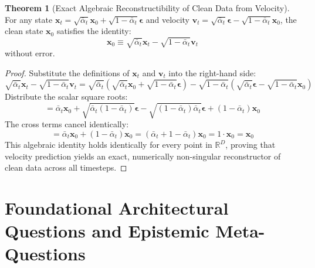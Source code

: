 \documentclass[11pt,a4paper]{article}
\theoremstyle{definition}
\newtheorem{theorem}{\textbf{Theorem}}[section]
\begin{document}
\begin{theorem}[Exact Algebraic Reconstructibility of Clean Data from Velocity]
For any state $\mathbf{x}_t = \sqrt{\bar{\alpha}_t}\mathbf{x}_0 + \sqrt{1 - \bar{\alpha}_t}\boldsymbol{\epsilon}$ and velocity $\mathbf{v}_t = \sqrt{\bar{\alpha}_t}\boldsymbol{\epsilon} - \sqrt{1 - \bar{\alpha}_t}\mathbf{x}_0$, the clean state $\mathbf{x}_0$ satisfies the identity:
{\boldmath
\begin{equation}
\mathbf{x}_0 \equiv \sqrt{\bar{\alpha}_t}\mathbf{x}_t - \sqrt{1 - \bar{\alpha}_t}\mathbf{v}_t
\end{equation}
}
without error.
\end{theorem}

\begin{proof}
Substitute the definitions of $\mathbf{x}_t$ and $\mathbf{v}_t$ into the right-hand side:
{\boldmath
\begin{equation}
\sqrt{\bar{\alpha}_t}\mathbf{x}_t - \sqrt{1 - \bar{\alpha}_t}\mathbf{v}_t = \sqrt{\bar{\alpha}_t}\left( \sqrt{\bar{\alpha}_t}\mathbf{x}_0 + \sqrt{1 - \bar{\alpha}_t}\boldsymbol{\epsilon} \right) - \sqrt{1 - \bar{\alpha}_t}\left( \sqrt{\bar{\alpha}_t}\boldsymbol{\epsilon} - \sqrt{1 - \bar{\alpha}_t}\mathbf{x}_0 \right)
\end{equation}
}
Distribute the scalar square roots:
{\boldmath
\begin{equation}
= \bar{\alpha}_t \mathbf{x}_0 + \sqrt{\bar{\alpha}_t(1 - \bar{\alpha}_t)}\boldsymbol{\epsilon} - \sqrt{(1 - \bar{\alpha}_t)\bar{\alpha}_t}\boldsymbol{\epsilon} + (1 - \bar{\alpha}_t)\mathbf{x}_0
\end{equation}
}
The cross terms cancel identically:
{\boldmath
\begin{equation}
= \bar{\alpha}_t \mathbf{x}_0 + (1 - \bar{\alpha}_t)\mathbf{x}_0 = (\bar{\alpha}_t + 1 - \bar{\alpha}_t)\mathbf{x}_0 = 1 \cdot \mathbf{x}_0 = \mathbf{x}_0
\end{equation}
}
This algebraic identity holds identically for every point in $\mathbb{R}^D$, proving that velocity prediction yields an exact, numerically non-singular reconstructor of clean data across all timesteps.
\end{proof}

\section{Foundational Architectural Questions and Epistemic Meta-Questions}
\end{document}

